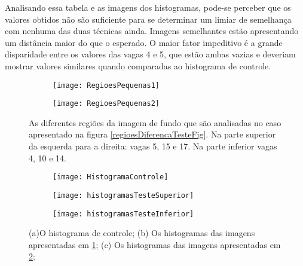 Analisando essa tabela e as imagens dos histogramas, pode-se perceber que os valores obtidos não são suficiente para se determinar um limiar de semelhança com nenhuma das duas técnicas ainda. Imagens semelhantes estão apresentando um distância maior do que o esperado. O maior fator impeditivo é a grande disparidade entre os valores das vagas 4 e 5, que estão ambas vazias e deveriam mostrar valores similares quando comparadas ao histograma de controle.


\begin{figure}
 \centering
 \begin{subfigure}{\textwidth}
  \centering
  \texttt{[image: RegioesPequenas1]}
  \caption{}
  \label{regioesPequenasTesteFig:sfig1}
\end{subfigure}%

\begin{subfigure}{\textwidth}
  \centering
  \texttt{[image: RegioesPequenas2]}
  \caption{}
  \label{regioesPequenasTesteFig:sfig2}
\end{subfigure}


\caption{As diferentes regiões da imagem de fundo que são analisadas no caso apresentado na figura \ref{regioesDiferencaTesteFig}. Na parte superior da esquerda para a direita: vagas 5, 15 e 17. Na parte inferior vagas 4, 10 e 14.}
\label{regioesPequenasTesteFig}
\end{figure}


\begin{figure}
 \centering
  \begin{subfigure}{.3\textwidth}
  \centering
  \texttt{[image: HistogramaControle]}
  \caption{}
  \label{histogramasRegioesPequenasFig:sfig1}
\end{subfigure}%


 \begin{subfigure}{.8\textwidth}
  \centering
  \texttt{[image: histogramasTesteSuperior]}
  \caption{}
  \label{histogramasRegioesPequenasFig:sfig1}
\end{subfigure}%

\begin{subfigure}{.8\textwidth}
  \centering
  \texttt{[image: histogramasTesteInferior]}
  \caption{}
  \label{histogramasRegioesPequenasFig:sfig2}
\end{subfigure}


\caption{(a)O histograma de controle; (b) Os histogramas das imagens apresentadas em  \ref{regioesPequenasTesteFig:sfig1}; (c) Os histogramas das imagens apresentadas em  \ref{regioesPequenasTesteFig:sfig2};}
\label{histogramasRegioesPequenasFig}
\end{figure}




